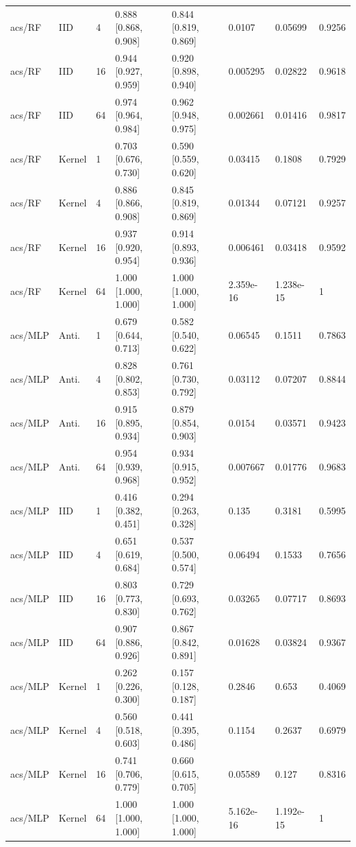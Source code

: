 \begin{tabular}{llllllll}
acs/RF & IID & 4 & 0.888 [0.868, 0.908] & 0.844 [0.819, 0.869] & 0.0107 & 0.05699 & 0.9256 \\
acs/RF & IID & 16 & 0.944 [0.927, 0.959] & 0.920 [0.898, 0.940] & 0.005295 & 0.02822 & 0.9618 \\
acs/RF & IID & 64 & 0.974 [0.964, 0.984] & 0.962 [0.948, 0.975] & 0.002661 & 0.01416 & 0.9817 \\
acs/RF & Kernel & 1 & 0.703 [0.676, 0.730] & 0.590 [0.559, 0.620] & 0.03415 & 0.1808 & 0.7929 \\
acs/RF & Kernel & 4 & 0.886 [0.866, 0.908] & 0.845 [0.819, 0.869] & 0.01344 & 0.07121 & 0.9257 \\
acs/RF & Kernel & 16 & 0.937 [0.920, 0.954] & 0.914 [0.893, 0.936] & 0.006461 & 0.03418 & 0.9592 \\
acs/RF & Kernel & 64 & 1.000 [1.000, 1.000] & 1.000 [1.000, 1.000] & 2.359e-16 & 1.238e-15 & 1 \\
acs/MLP & Anti. & 1 & 0.679 [0.644, 0.713] & 0.582 [0.540, 0.622] & 0.06545 & 0.1511 & 0.7863 \\
acs/MLP & Anti. & 4 & 0.828 [0.802, 0.853] & 0.761 [0.730, 0.792] & 0.03112 & 0.07207 & 0.8844 \\
acs/MLP & Anti. & 16 & 0.915 [0.895, 0.934] & 0.879 [0.854, 0.903] & 0.0154 & 0.03571 & 0.9423 \\
acs/MLP & Anti. & 64 & 0.954 [0.939, 0.968] & 0.934 [0.915, 0.952] & 0.007667 & 0.01776 & 0.9683 \\
acs/MLP & IID & 1 & 0.416 [0.382, 0.451] & 0.294 [0.263, 0.328] & 0.135 & 0.3181 & 0.5995 \\
acs/MLP & IID & 4 & 0.651 [0.619, 0.684] & 0.537 [0.500, 0.574] & 0.06494 & 0.1533 & 0.7656 \\
acs/MLP & IID & 16 & 0.803 [0.773, 0.830] & 0.729 [0.693, 0.762] & 0.03265 & 0.07717 & 0.8693 \\
acs/MLP & IID & 64 & 0.907 [0.886, 0.926] & 0.867 [0.842, 0.891] & 0.01628 & 0.03824 & 0.9367 \\
acs/MLP & Kernel & 1 & 0.262 [0.226, 0.300] & 0.157 [0.128, 0.187] & 0.2846 & 0.653 & 0.4069 \\
acs/MLP & Kernel & 4 & 0.560 [0.518, 0.603] & 0.441 [0.395, 0.486] & 0.1154 & 0.2637 & 0.6979 \\
acs/MLP & Kernel & 16 & 0.741 [0.706, 0.779] & 0.660 [0.615, 0.705] & 0.05589 & 0.127 & 0.8316 \\
acs/MLP & Kernel & 64 & 1.000 [1.000, 1.000] & 1.000 [1.000, 1.000] & 5.162e-16 & 1.192e-15 & 1 \\
\bottomrule
\end{tabular}

